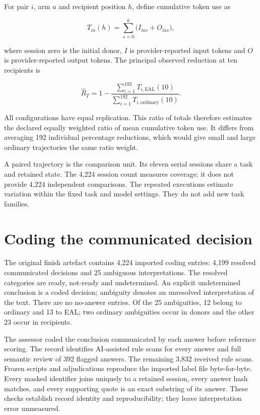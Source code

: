 \documentclass[
  11pt,
]{article}
\begin{document}
For pair \(i\), arm \(a\) and recipient position \(h\), define
cumulative token use as

\[
T_{ia}(h)=\sum_{s=0}^{h}\bigl(I_{ias}+O_{ias}\bigr),
\]

where session zero is the initial donor, \(I\) is provider-reported
input tokens and \(O\) is provider-reported output tokens. The principal
observed reduction at ten recipients is

\[
\widehat R_T=1-\frac{\sum_{i=1}^{192}T_{i,\mathrm{EAL}}(10)}{\sum_{i=1}^{192}T_{i,\mathrm{ordinary}}(10)}.
\]

All configurations have equal replication. This ratio of totals
therefore estimates the declared equally weighted ratio of mean
cumulative token use. It differs from averaging 192 individual
percentage reductions, which would give small and large ordinary
trajectories the same ratio weight.

A paired trajectory is the comparison unit. Its eleven serial sessions
share a task and retained state. The 4,224 session count measures
coverage; it does not provide 4,224 independent comparisons. The
repeated executions estimate variation within the fixed task and model
settings. They do not add new task families.

\FloatBarrier

\hypertarget{coding-the-communicated-decision}{%
\section{Coding the communicated
decision}\label{coding-the-communicated-decision}}

The original finish artefact contains 4,224 imported coding entries:
4,199 resolved communicated decisions and 25 ambiguous interpretations.
The resolved categories are ready, not-ready and undetermined. An
explicit undetermined conclusion is a coded decision; ambiguity denotes
an unresolved interpretation of the text. There are no no-answer
entries. Of the 25 ambiguities, 12 belong to ordinary and 13 to EAL; two
ordinary ambiguities occur in donors and the other 23 occur in
recipients.

The assessor coded the conclusion communicated by each answer before
reference scoring. The record identifies AI-assisted rule scans for
every answer and full semantic review of 392 flagged answers. The
remaining 3,832 received rule scans. Frozen scripts and adjudications
reproduce the imported label file byte-for-byte. Every masked identifier
joins uniquely to a retained session, every answer hash matches, and
every supporting quote is an exact substring of its answer. These checks
establish record identity and reproducibility; they leave interpretation
error unmeasured.
\end{document}
